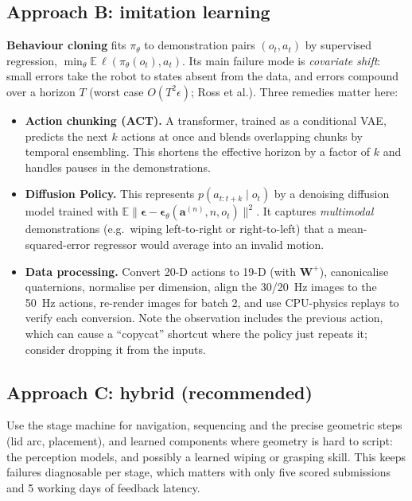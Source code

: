 \documentclass[10pt,a4paper]{article}
\begin{document}
\subsection{Approach B: imitation learning}
\textbf{Behaviour cloning} fits $\pi_\theta$ to demonstration pairs $(o_t,a_t)$ by supervised regression, $\min_\theta\mathbb E\,\ell(\pi_\theta(o_t),a_t)$. Its main failure mode is \emph{covariate shift}: small errors take the robot to states absent from the data, and errors compound over a horizon $T$ (worst case $O(T^2\epsilon)$; Ross et al.). Three remedies matter here:
\begin{itemize}
\item \textbf{Action chunking (ACT).} A transformer, trained as a conditional VAE, predicts the next $k$ actions at once and blends overlapping chunks by temporal ensembling. This shortens the effective horizon by a factor of $k$ and handles pauses in the demonstrations.
\item \textbf{Diffusion Policy.} This represents $p(a_{t:t+k}\mid o_t)$ by a denoising diffusion model trained with $\mathbb E\|\bm\epsilon-\bm\epsilon_\theta(\bm a^{(n)},n,o_t)\|^2$. It captures \emph{multimodal} demonstrations (e.g.\ wiping left-to-right or right-to-left) that a mean-squared-error regressor would average into an invalid motion.
\item \textbf{Data processing.} Convert 20-D actions to 19-D (with $\bm W^+$), canonicalise quaternions, normalise per dimension, align the 30/\SI{20}{\hertz} images to the \SI{50}{\hertz} actions, re-render images for batch 2, and use CPU-physics replays to verify each conversion. Note the observation includes the previous action, which can cause a ``copycat'' shortcut where the policy just repeats it; consider dropping it from the inputs.
\end{itemize}

\subsection{Approach C: hybrid (recommended)}
Use the stage machine for navigation, sequencing and the precise geometric steps (lid arc, placement), and learned components where geometry is hard to script: the perception models, and possibly a learned wiping or grasping skill. This keeps failures diagnosable per stage, which matters with only five scored submissions and 5 working days of feedback latency.

\end{document}
